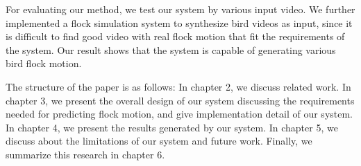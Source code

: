 For evaluating our method, we test our system by various input video. We further implemented a flock simulation system to synthesize bird videos as input, since it is difficult to find good video with real flock motion that fit the requirements of the system. Our result shows that the system is capable of generating various bird flock motion.


The structure of the paper is as follows: In chapter 2, we discuss related work. In chapter 3, we present the overall design of our system discussing the requirements needed for predicting flock motion, and give implementation detail of our system. In chapter 4, we present the results generated by our system. In chapter 5, we discuss about the limitations of our system and future work. Finally, we summarize this research in chapter 6.

